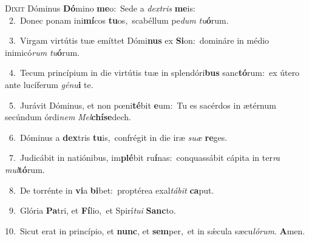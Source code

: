 \lettrine{\initial\textcolor{\initialcolor}{D}}{ixit} Dóminus \textbf{Dó}\-mino \textbf{me}\-o:~\star Sede a \textit{dex}\-\textit{tris} \textbf{me}\-is:\\
{\numbfont\textcolor{\numbcolor}{~2.}}~Donec ponam ini\-\textbf{mí}\-cos \textbf{tu}\-os,~\star scabéllum pe\textit{dum} \textit{tu}\-\textbf{ó}rum.\par
{\numbfont\textcolor{\numbcolor}{~3.}}~Virgam virtútis tuæ emíttet Dómi\textbf{nus} ex \textbf{Si}\-on:~\star domináre in médio inimicó\textit{rum} \textit{tu}\-\textbf{ó}rum.\par
{\numbfont\textcolor{\numbcolor}{~4.}}~Tecum princípium in die virtútis tuæ in splendóri\textbf{bus} sanc\-\textbf{tó}\-rum:~\star ex útero ante lucíferum \textit{gé}\-\textit{nu}\textbf{i} te.\par
{\numbfont\textcolor{\numbcolor}{~5.}}~Jurávit Dóminus, et non pœni\-\textbf{té}\-bit \textbf{e}\-um:~\star Tu es sacérdos in ætérnum secúndum órdi\textit{nem} \textit{Mel}\-\textbf{chí}\textbf{se}dech.\par
{\numbfont\textcolor{\numbcolor}{~6.}}~Dóminus a \textbf{dex}\-tris \textbf{tu}\-is,~\star confrégit in die iræ \textit{su}\-\textit{æ} \textbf{re}\-ges.\par
{\numbfont\textcolor{\numbcolor}{~7.}}~Judicábit in natiónibus, im\-\textbf{plé}\-bit ru\-\textbf{í}\-nas:~\star conquassábit cápita in ter\textit{ra} \textit{mul}\-\textbf{tó}rum.\par
{\numbfont\textcolor{\numbcolor}{~8.}}~De torrénte in \textbf{vi}\-a \textbf{bi}\-bet:~\star proptérea exal\-\textit{tá}\-\textit{bit} \textbf{ca}\-put.\par
{\numbfont\textcolor{\numbcolor}{~9.}}~Glória \textbf{Pa}\-tri, et \textbf{Fí}\-lio,~\star et Spirí\-\textit{tu}\-\textit{i} \textbf{Sanc}\-to.\par
{\numbfont\textcolor{\numbcolor}{10.}}~Sicut erat in princípio, et \textbf{nunc}\-, et \textbf{sem}\-per,~\star et in sǽcula sæcu\-\textit{ló}\-\textit{rum}. \textbf{A}\-men.\par
